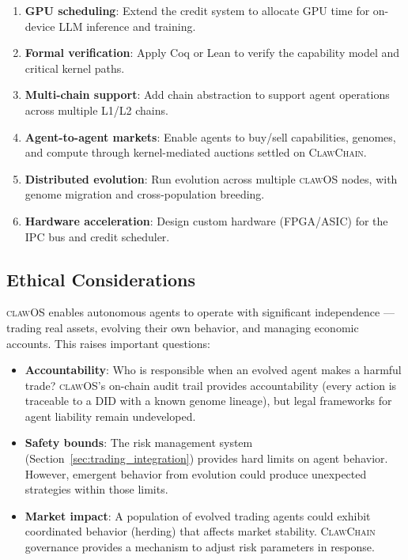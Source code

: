 \documentclass{article}
\newcommand{\clawos}{\textsc{clawOS}}
\newcommand{\clawchain}{\textsc{ClawChain}}
\begin{document}
\begin{enumerate}[leftmargin=*]
    \item \textbf{GPU scheduling}: Extend the credit system to allocate GPU time for on-device LLM inference and training.
    
    \item \textbf{Formal verification}: Apply Coq or Lean to verify the capability model and critical kernel paths.
    
    \item \textbf{Multi-chain support}: Add chain abstraction to support agent operations across multiple L1/L2 chains.
    
    \item \textbf{Agent-to-agent markets}: Enable agents to buy/sell capabilities, genomes, and compute through kernel-mediated auctions settled on \clawchain{}.
    
    \item \textbf{Distributed evolution}: Run evolution across multiple \clawos{} nodes, with genome migration and cross-population breeding.
    
    \item \textbf{Hardware acceleration}: Design custom hardware (FPGA/ASIC) for the IPC bus and credit scheduler.
\end{enumerate}

\subsection{Ethical Considerations}

\clawos{} enables autonomous agents to operate with significant independence — trading real assets, evolving their own behavior, and managing economic accounts. This raises important questions:

\begin{itemize}[leftmargin=*]
    \item \textbf{Accountability}: Who is responsible when an evolved agent makes a harmful trade? \clawos{}'s on-chain audit trail provides accountability (every action is traceable to a DID with a known genome lineage), but legal frameworks for agent liability remain undeveloped.
    
    \item \textbf{Safety bounds}: The risk management system (Section~\ref{sec:trading_integration}) provides hard limits on agent behavior. However, emergent behavior from evolution could produce unexpected strategies within those limits.
    
    \item \textbf{Market impact}: A population of evolved trading agents could exhibit coordinated behavior (herding) that affects market stability. \clawchain{} governance provides a mechanism to adjust risk parameters in response.
\end{itemize}
\end{document}

